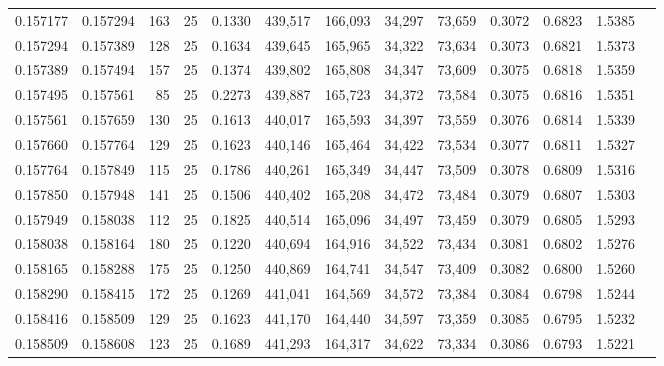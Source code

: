 \begin{tabular}{rrrrrrrrrrrrr}
0.157177 & 0.157294 &   163 &  25 &                                     0.1330 & 439,517 & 166,093 &  34,297 &  73,659 & 0.3072 & 0.6823 & 1.5385 \\
0.157294 & 0.157389 &   128 &  25 &                                     0.1634 & 439,645 & 165,965 &  34,322 &  73,634 & 0.3073 & 0.6821 & 1.5373 \\
0.157389 & 0.157494 &   157 &  25 &                                     0.1374 & 439,802 & 165,808 &  34,347 &  73,609 & 0.3075 & 0.6818 & 1.5359 \\
0.157495 & 0.157561 &    85 &  25 &                                     0.2273 & 439,887 & 165,723 &  34,372 &  73,584 & 0.3075 & 0.6816 & 1.5351 \\
0.157561 & 0.157659 &   130 &  25 &                                     0.1613 & 440,017 & 165,593 &  34,397 &  73,559 & 0.3076 & 0.6814 & 1.5339 \\
0.157660 & 0.157764 &   129 &  25 &                                     0.1623 & 440,146 & 165,464 &  34,422 &  73,534 & 0.3077 & 0.6811 & 1.5327 \\
0.157764 & 0.157849 &   115 &  25 &                                     0.1786 & 440,261 & 165,349 &  34,447 &  73,509 & 0.3078 & 0.6809 & 1.5316 \\
0.157850 & 0.157948 &   141 &  25 &                                     0.1506 & 440,402 & 165,208 &  34,472 &  73,484 & 0.3079 & 0.6807 & 1.5303 \\
0.157949 & 0.158038 &   112 &  25 &                                     0.1825 & 440,514 & 165,096 &  34,497 &  73,459 & 0.3079 & 0.6805 & 1.5293 \\
0.158038 & 0.158164 &   180 &  25 &                                     0.1220 & 440,694 & 164,916 &  34,522 &  73,434 & 0.3081 & 0.6802 & 1.5276 \\
0.158165 & 0.158288 &   175 &  25 &                                     0.1250 & 440,869 & 164,741 &  34,547 &  73,409 & 0.3082 & 0.6800 & 1.5260 \\
0.158290 & 0.158415 &   172 &  25 &                                     0.1269 & 441,041 & 164,569 &  34,572 &  73,384 & 0.3084 & 0.6798 & 1.5244 \\
0.158416 & 0.158509 &   129 &  25 &                                     0.1623 & 441,170 & 164,440 &  34,597 &  73,359 & 0.3085 & 0.6795 & 1.5232 \\
0.158509 & 0.158608 &   123 &  25 &                                     0.1689 & 441,293 & 164,317 &  34,622 &  73,334 & 0.3086 & 0.6793 & 1.5221 \\

\end{tabular}
